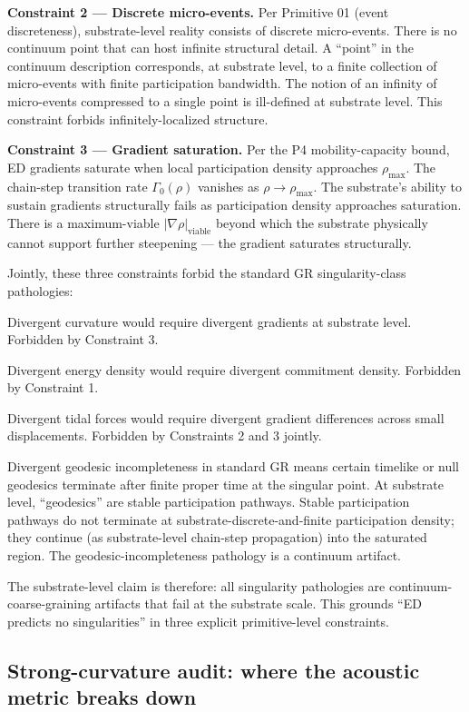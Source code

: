\documentclass[11pt,a4paper]{article}
\begin{document}
\textbf{Constraint 2 --- Discrete micro-events.} Per Primitive 01 (event discreteness), substrate-level reality consists of discrete micro-events. There is no continuum point that can host infinite structural detail. A ``point'' in the continuum description corresponds, at substrate level, to a finite collection of micro-events with finite participation bandwidth. The notion of an infinity of micro-events compressed to a single point is ill-defined at substrate level. This constraint forbids infinitely-localized structure.

\textbf{Constraint 3 --- Gradient saturation.} Per the P4 mobility-capacity bound, ED gradients saturate when local participation density approaches $\rho_{\mathrm{max}}$. The chain-step transition rate $\Gamma_0(\rho)$ vanishes as $\rho \to \rho_{\mathrm{max}}$. The substrate's ability to sustain gradients structurally fails as participation density approaches saturation. There is a maximum-viable $|\nabla\rho|_{\mathrm{viable}}$ beyond which the substrate physically cannot support further steepening --- the gradient saturates structurally.

Jointly, these three constraints forbid the standard GR singularity-class pathologies:

Divergent curvature would require divergent gradients at substrate level. Forbidden by Constraint 3.

Divergent energy density would require divergent commitment density. Forbidden by Constraint 1.

Divergent tidal forces would require divergent gradient differences across small displacements. Forbidden by Constraints 2 and 3 jointly.

Divergent geodesic incompleteness in standard GR means certain timelike or null geodesics terminate after finite proper time at the singular point. At substrate level, ``geodesics'' are stable participation pathways. Stable participation pathways do not terminate at substrate-discrete-and-finite participation density; they continue (as substrate-level chain-step propagation) into the saturated region. The geodesic-incompleteness pathology is a continuum artifact.

The substrate-level claim is therefore: all singularity pathologies are continuum-coarse-graining artifacts that fail at the substrate scale. This grounds ``ED predicts no singularities'' in three explicit primitive-level constraints.

\subsection{Strong-curvature audit: where the acoustic metric breaks down}
\end{document}
